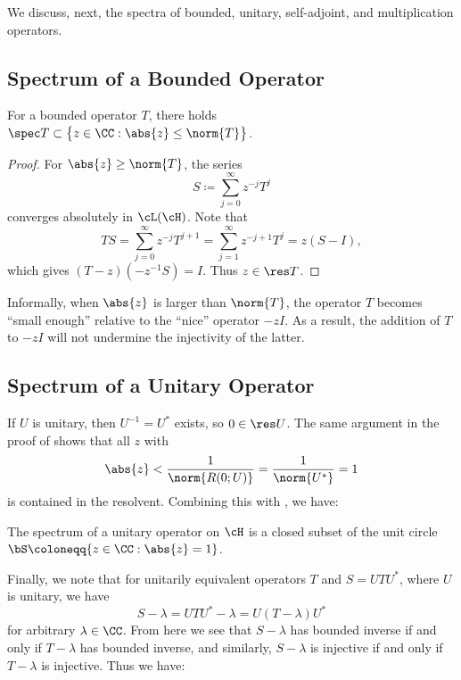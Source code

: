 \documentclass[oneside,reqno,letterpaper]{amsart}
\begin{document}
We discuss, next, the spectra of bounded, unitary, self-adjoint, and multiplication operators. 

\subsection{Spectrum of a Bounded Operator}

\begin{theorem}
\label{thm:bounded-spectrum}
  For a bounded operator \(T\), there holds
  \(\spec T \subset \big\{z \in \CC: \abs{z} \leq \norm{T}\big\}\). 
\end{theorem}
\begin{proof}
  For \(\abs{z} \geq \norm{T}\), the series 
  \[
    S \coloneqq \sum_{j=0}^{\infty} z^{-j} T^j
  \] 
  converges absolutely in \(\cL(\cH)\). 
  Note that 
  \[
  TS 
  = \sum_{j=0}^{\infty} z^{-j} T^{j + 1}
  = \sum_{j=1}^{\infty} z^{-j + 1} T^{j}
  = z (S - I), 
  \] 
  which gives \((T - z) \left( -z^{-1} S \right) = I\). 
  Thus \(z \in \res T\). 
\end{proof}

Informally, when \(\abs{z}\) is larger than \(\norm{T}\), the operator \(T\) becomes ``small enough'' relative to the ``nice'' operator \(-zI\).
As a result, the addition of \(T\) to \(-zI\) will not undermine the injectivity of the latter. 


\subsection{Spectrum of a Unitary Operator}

If \(U\) is unitary, then \(U^{-1} = U^*\) exists, so \(0 \in \res U\). 
The same argument in the proof of  shows that all \(z\) with 
\[
  \abs{z} < \frac{1}{\norm{R(0; U)}} = \frac{1}{\norm{U^*}} = 1
\] 
is contained in the resolvent. 
Combining this with , we have:

\begin{corollary}
\label{thm:unitary-spectrum}
  The spectrum of a unitary operator on \(\cH\) is a closed subset of the unit circle \(\bS \coloneqq \{z \in \CC: \abs{z} = 1\}\). 
\end{corollary}


Finally, we note that for unitarily equivalent operators \(T\) and \(S = U T U^*\), where \(U\) is unitary, we have 
\[
  S - \lambda = U T U^* - \lambda = U (T - \lambda) U^* 
\] 
for arbitrary \(\lambda \in \CC\). 
From here we see that \(S - \lambda\) has bounded inverse if and only if \(T - \lambda\) has bounded inverse, and similarly, \(S - \lambda\) is injective if and only if \(T - \lambda\) is injective. 
Thus we have:
\end{document}
